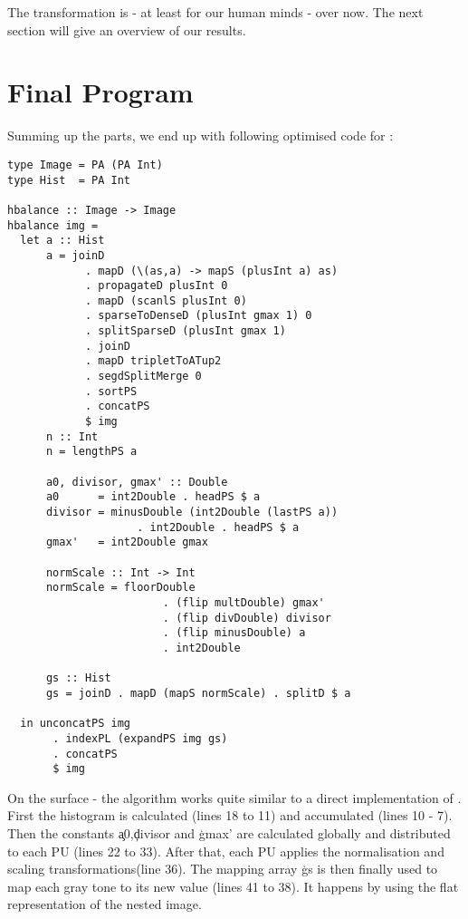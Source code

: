        The transformation is - at least for our human minds - over now. The next
       section will give an overview of our results.
           
  \section{Final Program}
    Summing up the parts, we end up with following optimised code for \ndpv:
    \begin{lstlisting}
type Image = PA (PA Int)
type Hist  = PA Int

hbalance :: Image -> Image
hbalance img =
  let a :: Hist
      a = joinD
            . mapD (\(as,a) -> mapS (plusInt a) as)
            . propagateD plusInt 0
            . mapD (scanlS plusInt 0)
            . sparseToDenseD (plusInt gmax 1) 0
            . splitSparseD (plusInt gmax 1)
            . joinD
            . mapD tripletToATup2
            . segdSplitMerge 0
            . sortPS
            . concatPS
            $ img
      n :: Int
      n = lengthPS a
      
      a0, divisor, gmax' :: Double
      a0      = int2Double . headPS $ a
      divisor = minusDouble (int2Double (lastPS a))
                    . int2Double . headPS $ a
      gmax'   = int2Double gmax
      
      normScale :: Int -> Int
      normScale = floorDouble
                        . (flip multDouble) gmax'
                        . (flip divDouble) divisor
                        . (flip minusDouble) a
                        . int2Double
        
      gs :: Hist
      gs = joinD . mapD (mapS normScale) . splitD $ a
      
  in unconcatPS img
       . indexPL (expandPS img gs)
       . concatPS
       $ img
    \end{lstlisting}
    On the surface - the algorithm works quite similar to a direct
    implementation of \ndpn.
    First the histogram is calculated (lines 18 to 11) and accumulated (lines 10 - 7).
    Then the constants \c{a0},\c{divisor} and \c{gmax'} are calculated globally and distributed
    to each PU (lines 22 to 33). After that, each PU applies the normalisation and scaling transformations(line 36).
    The mapping array \c{gs} is then finally used to map
    each gray tone to its new value (lines 41 to 38). It happens by using the
    flat representation of the nested image.
    
